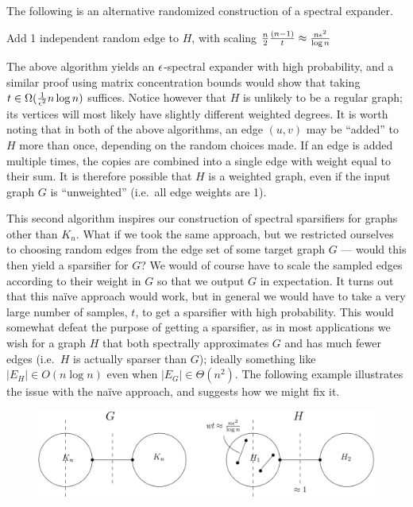\documentclass[11pt]{article}
\begin{document}
The following is an alternative randomized construction of a spectral expander.

\begin{algorithm}
\caption*{$\textsc{Expander2}$:}
\begin{algorithmic}
\State{}
\Indent
    \vspace*{-0.2em}
    \State Add 1 independent random edge to $H$, with scaling
        $\frac{n}{2}\frac{(n-1)}{t} \approx \frac{n \epsilon^2}{\log n}$
\EndIndent
\smallskip
\end{algorithmic}
\end{algorithm}

The above algorithm yields an $\epsilon$-spectral expander with high probability,
and a similar proof using matrix concentration bounds would show that taking $t
\in \Omega(\frac{1}{\epsilon^2}n \log n)$ suffices. Notice however that $H$ is
unlikely to be a regular graph; its vertices will most likely have slightly
different weighted degrees. It is worth noting that in both of the above
algorithms, an edge $(u,v)$ may be ``added'' to $H$ more than once, depending
on the random choices made. If an edge is added multiple times, the copies are
combined into a single edge with weight equal to their sum. It is therefore
possible that $H$ is a weighted graph, even if the input graph $G$ is
``unweighted'' (i.e.\ all edge weights are 1).

This second algorithm inspires our construction of spectral sparsifiers for
graphs other than $K_n$. What if we took the same approach, but we restricted
ourselves to choosing random edges from the edge set of some target graph $G$
--- would this then yield a sparsifier for $G$? We would of course have to
scale the sampled edges according to their weight in $G$ so that we output $G$
in expectation. It turns out that this na\"ive approach would work, but in
general we would have to take a very large number of samples, $t$, to get a
sparsifier with high probability. This would somewhat defeat the purpose of
getting a sparsifier, as in most applications we wish for a graph $H$ that both
spectrally approximates $G$ and has much fewer edges (i.e.\ $H$ is actually
sparser than $G$); ideally something like $|E_H| \in O(n \log n)$ even when
$|E_G| \in \Theta(n^2)$. The following example illustrates the issue with the
na\"ive approach, and suggests how we might fix it.

\begin{figure}[ht]
\centering
\label{fig:dumbbell}
\includegraphics[scale=0.5]{images/dumbbell.svg}
\end{figure}
\end{document}
